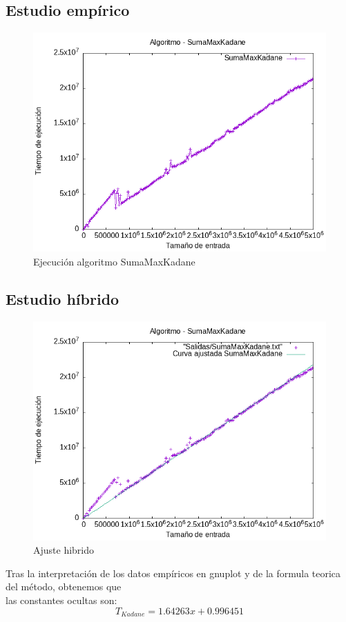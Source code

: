\documentclass[11pt,openany]{book}
\begin{document}
\subsection{Estudio empírico}
\begin{center}
      \begin{figure}[H]
            \centering
            \includegraphics[width=0.7\linewidth]{assets/Img/SumaMaxKadane.png}
            \caption{Ejecución algoritmo SumaMaxKadane}
            \label{fig:SumaMaxKadane}
      \end{figure}
\end{center}
\subsection{Estudio híbrido}
\begin{center}
      \begin{figure}[H]
            \centering
            \includegraphics[width=0.7\linewidth]{assets/Img/SumaMaxKadane_hib.png}
            \caption{Ajuste hibrido}
            \label{fig:SumaMaxKadanehibrido}
      \end{figure}
\end{center}
Tras la interpretación de los datos empíricos en gnuplot y de la formula teorica del método, obtenemos que \\
las constantes ocultas son:
\begin{equation*}
      T_{Kadane}=1.64263x + 0.996451
\end{equation*}
\end{document}
